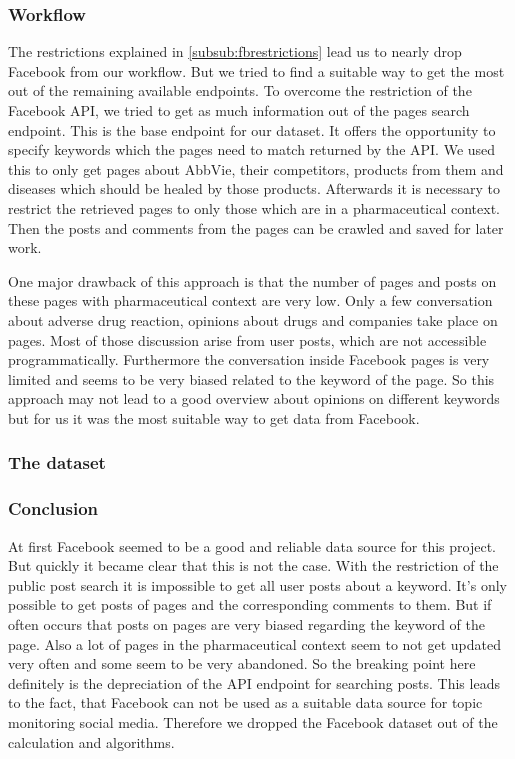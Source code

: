 \documentclass[11pt,titlepage,oneside,openany]{book}
\begin{document}
\subsubsection{Workflow}

The restrictions explained in \autoref{subsub:fbrestrictions} lead us to nearly drop Facebook from our workflow. But we tried to find a suitable way to get the most out of the remaining available endpoints.
To overcome the restriction of the Facebook API, we tried to get as much information out of the pages search endpoint. This is the base endpoint for our dataset. It offers the opportunity to specify keywords which the pages need to match returned by the API. We used this to only get pages about AbbVie, their competitors, products from them and diseases which should be healed by those products. Afterwards it is necessary to restrict the retrieved pages to only those which are in a pharmaceutical context. Then the posts and comments from the pages can be crawled and saved for later work.\par
One major drawback of this approach is that the number of pages and posts on these pages with pharmaceutical context are very low. Only a few conversation about adverse drug reaction, opinions about drugs and companies take place on pages. Most of those discussion arise from user posts, which are not accessible programmatically. Furthermore the conversation inside Facebook pages is very limited and seems to be very biased related to the keyword of the page.
So this approach may not lead to a good overview about opinions on different keywords but for us it was the most suitable way to get data from Facebook.


\subsubsection{The dataset}
\subsubsection{Conclusion}
At first Facebook seemed to be a good and reliable data source for this project. But quickly it became clear that this is not the case. With the restriction of the public post search it is impossible to get all user posts about a keyword. It’s only possible to get posts of pages and the corresponding comments to them. But if often occurs that posts on pages are very biased regarding the keyword of the page. Also a lot of pages in the pharmaceutical context seem to not get updated very often and some seem to be very abandoned. So the breaking point here definitely is the depreciation of the API endpoint for searching posts. This leads to the fact, that Facebook can not be used as a suitable data source for topic monitoring social media. Therefore we dropped the Facebook dataset out of the calculation and algorithms.
\end{document}
